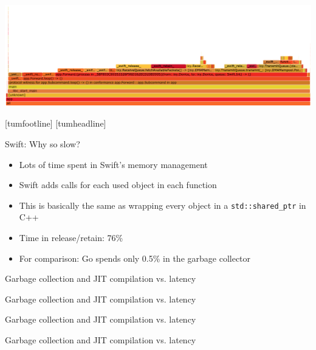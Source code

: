 \documentclass[NET,english,aspectratio=169,notitleframe]{tumbeamer}
\begin{document}
\begin{frame}{}
\hspace{-.5cm}\includegraphics[width=1.065\textwidth]{pics/flamegraph}
\end{frame}
[tumfootline]
[tumheadline]

\begin{frame}{Swift: Why so slow?}
\begin{itemize}
\item Lots of time spent in Swift's memory management
\item Swift adds calls for each used object in each function
\item This is basically the same as wrapping every object in a \texttt{std::shared\_ptr} in C++
\vspace{1em}
\pause
\item Time in release/retain: 76\%
\item For comparison: Go spends only 0.5\% in the garbage collector
\end{itemize}
\end{frame}

\begin{frame}{Garbage collection and JIT compilation vs. latency}
\end{frame}

\begin{frame}{Garbage collection and JIT compilation vs. latency}
\end{frame}

\begin{frame}{Garbage collection and JIT compilation vs. latency}
\end{frame}

\begin{frame}{Garbage collection and JIT compilation vs. latency}
\end{frame}
\end{document}
